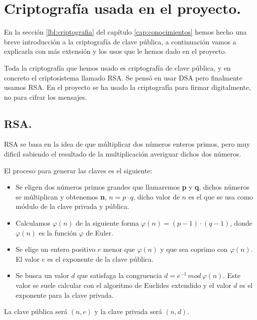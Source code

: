 \chapter{Criptografía usada en el proyecto.}

En la sección \ref{lbl:criptografia} del capítulo \ref{cap:conocimientos} hemos hecho una breve introducción a la criptografía de clave pública, a continuación vamos a explicarla con más extensión y los usos que le hemos dado en el proyecto.

Toda la criptografía que hemos usado es criptografía de clave pública, y en concreto el criptosistema llamado RSA. Se pensó en usar DSA pero finalmente usamos RSA. En el proyecto se ha usado la criptografía para firmar digitalmente, no para cifrar los mensajes.

\section{RSA.}

RSA se basa en la idea de que múltiplicar dos números enteros primos, pero muy dificil sabiendo el resultado de la multiplicación averiguar dichos dos números.

El proceso para generar las claves es el siguiente:
\begin{itemize}

	\item Se eligen dos números primos grandes que llamaremos \textbf{p} y \textbf{q}, dichos números se múltiplican y obtenemos \textbf{n}, $n = p \cdot q$, dicho valor de $n$ es el que se usa como módulo de la clave privada y pública. 

	\item Calculamos $\varphi(n)$ de la siguiente forma $\varphi(n)=(p-1)\cdot(q-1)$, donde $\varphi(n)$ es la función $\varphi$ de Euler.

	\item Se elige un entero positivo $e$ menor que $\varphi(n)$ y que sea coprimo con $\varphi(n)$. El valor $e$ es el exponente de la clave pública.
	
	\item Se busca un valor $d$ que satisfaga la congruencia $d=e^{-1}\,mod\,\varphi(n)$. Este valor se suele calcular con el algoritmo de Euclides extendido y el valor $d$ es el exponente para la clave privada. 
\end{itemize}

La clave pública será $(n,e)$ y la clave privada será $(n,d)$.

